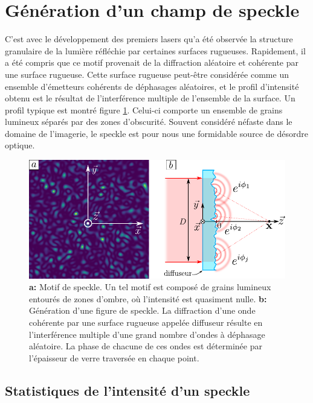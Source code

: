 \section{Génération d'un champ de speckle}
C'est avec le développement des premiers lasers qu'a été observée la structure granulaire de la lumière réfléchie par certaines surfaces rugueuses. Rapidement, il a été compris que ce motif provenait de la diffraction aléatoire et cohérente par une surface rugueuse. 
Cette surface rugueuse peut-être considérée comme un ensemble d'émetteurs cohérents de déphasages aléatoires, et le profil d'intensité obtenu est le résultat de l'interférence multiple de l'ensemble de la surface. Un profil typique est montré figure \ref{fig:speckle_pattern}. Celui-ci comporte un ensemble de grains lumineux séparés par des zones d'obscurité.
Souvent considéré néfaste dans le domaine de l'imagerie, le speckle est pour nous une formidable source de désordre optique. 

\begin{figure}
\centering
\includegraphics[scale=1]{Fig/Speckle/speckle_pattern.pdf}
\caption{\textbf{a:} Motif de speckle. Un tel motif est composé de grains lumineux entourés de zones d'ombre, où l'intensité est quasiment nulle. \textbf{b:} Génération d'une figure de speckle. La diffraction d'une onde cohérente par une surface rugueuse appelée diffuseur résulte en l'interférence multiple d'une grand nombre d'ondes à déphasage aléatoire. La phase de chacune de ces ondes est déterminée par l'épaisseur de verre traversée en chaque point.}
\label{fig:speckle_pattern}
\end{figure}



\subsection{Statistiques de l'intensité d'un speckle}

